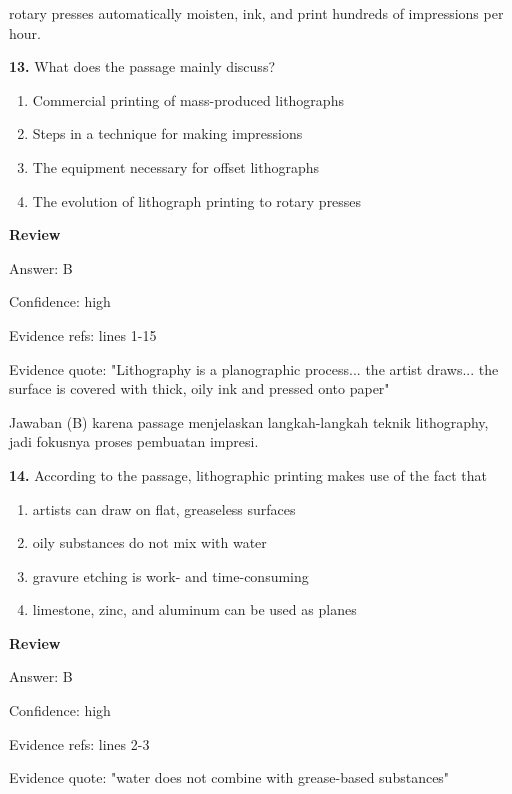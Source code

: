 \documentclass[12pt]{article}
\begin{document}
rotary presses automatically moisten, ink, and print hundreds of impressions per hour.\par
\endgroup
\medskip
\noindent\textbf{13.} What does the passage mainly discuss?
\begin{enumerate}[label=(\Alph*),leftmargin=*,itemsep=0.2em]
\item Commercial printing of mass-produced lithographs
\item Steps in a technique for making impressions
\item The equipment necessary for offset lithographs
\item The evolution of lithograph printing to rotary presses
\end{enumerate}
\par
\begingroup
\setlength{\parskip}{0pt}
\setlength{\parindent}{0pt}
\textbf{Review}\par
Answer: B\par
Confidence: high\par
Evidence refs: lines 1-15\par
Evidence quote: "Lithography is a planographic process... the artist draws... the surface is covered with thick, oily ink and pressed onto paper"\par
Jawaban (B) karena passage menjelaskan langkah-langkah teknik lithography, jadi fokusnya proses pembuatan impresi.\par
\endgroup
\par
\vspace{0.25\baselineskip}
\noindent\textbf{14.} According to the passage, lithographic printing makes use of the fact that
\begin{enumerate}[label=(\Alph*),leftmargin=*,itemsep=0.2em]
\item artists can draw on flat, greaseless surfaces
\item oily substances do not mix with water
\item gravure etching is work- and time-consuming
\item limestone, zinc, and aluminum can be used as planes
\end{enumerate}
\par
\begingroup
\setlength{\parskip}{0pt}
\setlength{\parindent}{0pt}
\textbf{Review}\par
Answer: B\par
Confidence: high\par
Evidence refs: lines 2-3\par
Evidence quote: "water does not combine with grease-based substances"\par
\end{document}
